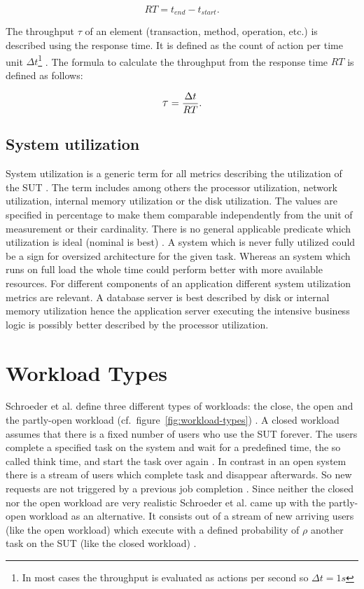 \[
  RT = t_{end} - t_{start} .
\]

The throughput \large{$\tau$}\normalsize{} of an element (transaction, method, operation, etc.) is described using the response time. It is defined as the count of action per time unit $\Delta t$\footnote{In most cases the throughput is evaluated as actions per second so $\Delta t = 1s$} \cite[19]{lilja.2005}. The formula to calculate the throughput from the response time $RT$ is defined as follows:

\[
  \mathlarger{\tau} = \frac{\Delta t}{RT} .
\]

\subsection*{System utilization}
System utilization is a generic term for all metrics describing the utilization of the \acf{SUT} \cite[48]{jain.2008}. The term includes among others the processor utilization, network utilization, internal memory utilization or the disk utilization. The values are specified in percentage to make them comparable independently from the unit of measurement or their cardinality. There is no general applicable predicate which utilization is ideal (nominal is best) \cite[54]{jain.2008}. A system which is never fully utilized could be a sign for oversized architecture for the given task. Whereas an system which runs on full load the whole time could perform better with more available resources. For different components of an application different system utilization metrics are relevant. A database server is best described by disk or internal memory utilization hence the application server executing the intensive business logic is possibly better described by the processor utilization.

\section{Workload Types}
\label{sec:workloads}
Schroeder et al. define three different types of workloads: the close, the open and the partly-open workload (cf.~figure~\ref{fig:workload-types}) \cite{Schroeder.2006}. A closed workload assumes that there is a fixed number of users who use the \ac{SUT} forever. The users complete a specified task on the system and wait for a predefined time, the so called think time, and start the task over again \cite[3]{Schroeder.2006}. In contrast in an open system there is a stream of users which complete task and disappear afterwards. So new requests are not triggered by a previous job completion \cite[3]{Schroeder.2006}. Since neither the closed nor the open workload are very realistic Schroeder et al. came up with the partly-open workload as an alternative. It consists out of a stream of new arriving users (like the open workload) which execute with a defined probability of $\rho$ another task on the \ac{SUT} (like the closed workload) \cite[3 - 4]{Schroeder.2006}.

